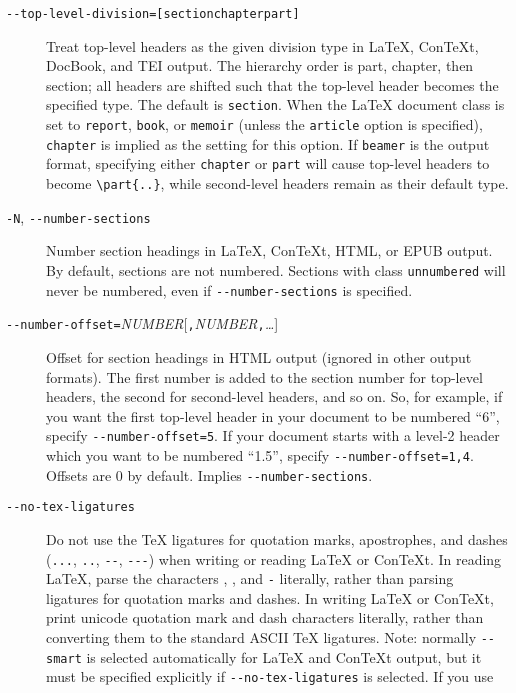 \documentclass[]{article}
\begin{document}
\begin{description}
\item[\texttt{-\/-top-level-division={[}section\textbar{}chapter\textbar{}part{]}}]
Treat top-level headers as the given division type in LaTeX, ConTeXt,
DocBook, and TEI output. The hierarchy order is part, chapter, then
section; all headers are shifted such that the top-level header becomes
the specified type. The default is \texttt{section}. When the LaTeX
document class is set to \texttt{report}, \texttt{book}, or
\texttt{memoir} (unless the \texttt{article} option is specified),
\texttt{chapter} is implied as the setting for this option. If
\texttt{beamer} is the output format, specifying either \texttt{chapter}
or \texttt{part} will cause top-level headers to become
\texttt{\textbackslash{}part\{..\}}, while second-level headers remain
as their default type.
\item[\texttt{-N}, \texttt{-\/-number-sections}]
Number section headings in LaTeX, ConTeXt, HTML, or EPUB output. By
default, sections are not numbered. Sections with class
\texttt{unnumbered} will never be numbered, even if
\texttt{-\/-number-sections} is specified.
\item[\texttt{-\/-number-offset=}\emph{NUMBER}{[}\texttt{,}\emph{NUMBER}\texttt{,}\emph{\ldots{}}{]}]
Offset for section headings in HTML output (ignored in other output
formats). The first number is added to the section number for top-level
headers, the second for second-level headers, and so on. So, for
example, if you want the first top-level header in your document to be
numbered ``6'', specify \texttt{-\/-number-offset=5}. If your document
starts with a level-2 header which you want to be numbered ``1.5'',
specify \texttt{-\/-number-offset=1,4}. Offsets are 0 by default.
Implies \texttt{-\/-number-sections}.
\item[\texttt{-\/-no-tex-ligatures}]
Do not use the TeX ligatures for quotation marks, apostrophes, and
dashes (\texttt{\textasciigrave{}...\textquotesingle{}},
\texttt{\textasciigrave{}\textasciigrave{}..\textquotesingle{}\textquotesingle{}},
\texttt{-\/-}, \texttt{-\/-\/-}) when writing or reading LaTeX or
ConTeXt. In reading LaTeX, parse the characters
\texttt{\textasciigrave{}}, \texttt{\textquotesingle{}}, and \texttt{-}
literally, rather than parsing ligatures for quotation marks and dashes.
In writing LaTeX or ConTeXt, print unicode quotation mark and dash
characters literally, rather than converting them to the standard ASCII
TeX ligatures. Note: normally \texttt{-\/-smart} is selected
automatically for LaTeX and ConTeXt output, but it must be specified
explicitly if \texttt{-\/-no-tex-ligatures} is selected. If you use

\end{description}
\end{document}
